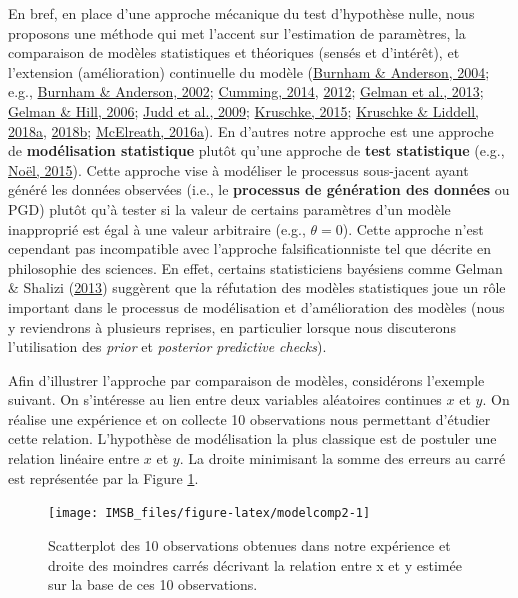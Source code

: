 \documentclass[
  a4paper,11pt,twoside,onecolumn,openright,final,oldfontcommands]{memoir}
\theoremstyle{definition}
\theoremstyle{definition}
\theoremstyle{definition}
\theoremstyle{definition}
\theoremstyle{remark}
\begin{document}
En bref, en place d'une approche mécanique du test d'hypothèse nulle, nous proposons une méthode qui met l'accent sur l'estimation de paramètres, la comparaison de modèles statistiques et théoriques (sensés et d'intérêt), et l'extension (amélioration) continuelle du modèle (\protect\hyperlink{ref-burnham_multimodel_2004}{Burnham \& Anderson, 2004}; e.g., \protect\hyperlink{ref-burnham_model_2002}{Burnham \& Anderson, 2002}; \protect\hyperlink{ref-cumming_new_2014}{Cumming, 2014}, \protect\hyperlink{ref-Cumming2012}{2012}; \protect\hyperlink{ref-gelman_bayesian_2013}{Gelman et al., 2013}; \protect\hyperlink{ref-gelman_data_2006}{Gelman \& Hill, 2006}; \protect\hyperlink{ref-judd_data_2009}{Judd et al., 2009}; \protect\hyperlink{ref-kruschke_doing_2015}{Kruschke, 2015}; \protect\hyperlink{ref-kruschke_bayesian_2018}{Kruschke \& Liddell, 2018a}, \protect\hyperlink{ref-kruschke_bayesian_2018-1}{2018b}; \protect\hyperlink{ref-R-rethinking}{McElreath, 2016a}). En d'autres notre approche est une approche de \textbf{modélisation statistique} plutôt qu'une approche de \textbf{test statistique} (e.g., \protect\hyperlink{ref-noel_psychologie_2015}{Noël, 2015}). Cette approche vise à modéliser le processus sous-jacent ayant généré les données observées (i.e., le \textbf{processus de génération des données} ou PGD) plutôt qu'à tester si la valeur de certains paramètres d'un modèle inapproprié est égal à une valeur arbitraire (e.g., \(\theta = 0\)). Cette approche n'est cependant pas incompatible avec l'approche falsificationniste tel que décrite en philosophie des sciences. En effet, certains statisticiens bayésiens comme Gelman \& Shalizi (\protect\hyperlink{ref-gelman_philosophy_2013}{2013}) suggèrent que la réfutation des modèles statistiques joue un rôle important dans le processus de modélisation et d'amélioration des modèles (nous y reviendrons à plusieurs reprises, en particulier lorsque nous discuterons l'utilisation des \emph{prior} et \emph{posterior predictive checks}).

Afin d'illustrer l'approche par comparaison de modèles, considérons l'exemple suivant. On s'intéresse au lien entre deux variables aléatoires continues \(x\) et \(y\). On réalise une expérience et on collecte 10 observations nous permettant d'étudier cette relation. L'hypothèse de modélisation la plus classique est de postuler une relation linéaire entre \(x\) et \(y\). La droite minimisant la somme des erreurs au carré est représentée par la Figure \ref{fig:modelcomp2}.

\begin{figure}[!htb]

{\centering \texttt{[image: IMSB\_files/figure-latex/modelcomp2-1]} 

}

\caption{Scatterplot des 10 observations obtenues dans notre expérience et droite des moindres carrés décrivant la relation entre x et y estimée sur la base de ces 10 observations.}\label{fig:modelcomp2}
\end{figure}
\end{document}
